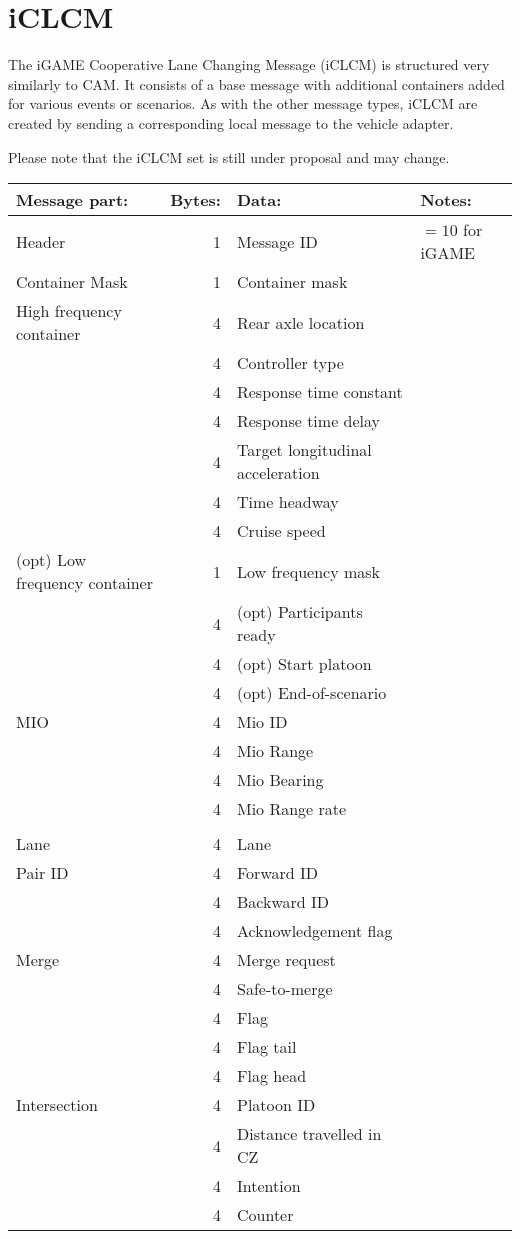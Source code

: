 \documentclass[11pt]{article}
\begin{document}
\section{iCLCM}
\label{sec:orgheadline4}
The iGAME Cooperative Lane Changing Message (iCLCM) is structured very
similarly to CAM. It consists of a base message with additional
containers added for various events or scenarios. As with the other
message types, iCLCM are created by sending a corresponding local
message to the vehicle adapter.

Please note that the iCLCM set is still under proposal and may change.


\begin{center}
\begin{tabular}{lrll}
Message part: & Bytes: & Data: & Notes:\\
\hline
Header & 1 & Message ID & \(=10\) for iGAME\\
\hline
Container Mask & 1 & Container mask & \\
\hline
High frequency container & 4 & Rear axle location & \\
 & 4 & Controller type & \\
 & 4 & Response time constant & \\
 & 4 & Response time delay & \\
 & 4 & Target longitudinal acceleration & \\
 & 4 & Time headway & \\
 & 4 & Cruise speed & \\
\hline
(opt) Low frequency container & 1 & Low frequency mask & \\
 & 4 & (opt) Participants ready & \\
 & 4 & (opt) Start platoon & \\
 & 4 & (opt) End-of-scenario & \\
\hline
MIO & 4 & Mio ID & \\
 & 4 & Mio Range & \\
 & 4 & Mio Bearing & \\
 & 4 & Mio Range rate & \\
 &  &  & \\
\hline
Lane & 4 & Lane & \\
\hline
Pair ID & 4 & Forward ID & \\
 & 4 & Backward ID & \\
 & 4 & Acknowledgement flag & \\
\hline
Merge & 4 & Merge request & \\
 & 4 & Safe-to-merge & \\
 & 4 & Flag & \\
 & 4 & Flag tail & \\
 & 4 & Flag head & \\
\hline
Intersection & 4 & Platoon ID & \\
 & 4 & Distance travelled in CZ & \\
 & 4 & Intention & \\
 & 4 & Counter & \\
\end{tabular}
\end{center}
\end{document}
